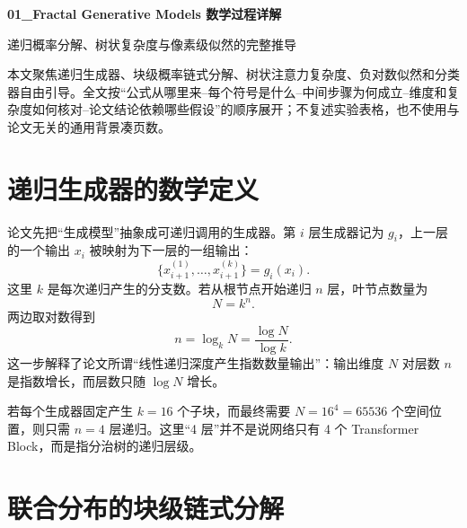 \documentclass[UTF8,12pt,a4paper,fontset=none]{ctexart}
\numberwithin{equation}{section}
\begin{document}
\begin{center}
{\LARGE\bfseries 01\_Fractal Generative Models 数学过程详解}\par
\vspace{0.35em}
{\large 递归概率分解、树状复杂度与像素级似然的完整推导}
\end{center}
\vspace{0.45em}
\begin{keybox}[本文只处理真正需要推导的部分]
本文聚焦递归生成器、块级概率链式分解、树状注意力复杂度、负对数似然和分类器自由引导。全文按“公式从哪里来--每个符号是什么--中间步骤为何成立--维度和复杂度如何核对--论文结论依赖哪些假设”的顺序展开；不复述实验表格，也不使用与论文无关的通用背景凑页数。
\end{keybox}
\tableofcontents
\newpage

\section{递归生成器的数学定义}
论文先把“生成模型”抽象成可递归调用的生成器。第 $i$ 层生成器记为 $g_i$，上一层的一个输出 $x_i$ 被映射为下一层的一组输出：
\begin{equation}
  \{x_{i+1}^{(1)},\ldots,x_{i+1}^{(k)}\}=g_i(x_i).
\end{equation}
这里 $k$ 是每次递归产生的分支数。若从根节点开始递归 $n$ 层，叶节点数量为
\begin{equation}
  N=k^n.
\end{equation}
两边取对数得到
\begin{equation}
  \boxed{n=\log_k N=\frac{\log N}{\log k}}.
\end{equation}
这一步解释了论文所谓“线性递归深度产生指数数量输出”：输出维度 $N$ 对层数 $n$ 是指数增长，而层数只随 $\log N$ 增长。

\begin{examplebox}[256×256 图像的递归层数]
若每个生成器固定产生 $k=16$ 个子块，而最终需要 $N=16^4=65536$ 个空间位置，则只需 $n=4$ 层递归。这里“4 层”并不是说网络只有 4 个 Transformer Block，而是指分治树的递归层级。
\end{examplebox}

\section{联合分布的块级链式分解}
\end{document}

